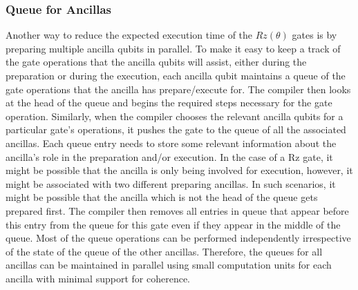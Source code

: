 \subsubsection{Queue for Ancillas}
Another way to reduce the expected execution time of the $Rz(\theta)$ gates is by preparing multiple ancilla qubits in parallel. To make it easy to keep a track of the gate operations that the ancilla qubits will assist, either during the preparation or during the execution, each ancilla qubit maintains a queue of the gate operations that the ancilla has prepare/execute for. The compiler then looks at the head of the queue and begins the required steps necessary for the gate operation. Similarly, when the compiler chooses the relevant ancilla qubits for a particular gate's operations, it pushes the gate to the queue of all the associated ancillas. Each queue entry needs to store some relevant information about the ancilla's role in the preparation and/or execution. In the case of a Rz gate, it might be possible that the ancilla is only being involved for execution, however, it might be associated with two different preparing ancillas. In such scenarios, it might be possible that the ancilla which is not the head of the queue gets prepared first. The compiler then removes all entries in queue that appear before this entry from the queue for this gate even if they appear in the middle of the queue. Most of the queue operations can be performed independently irrespective of the state of the queue of the other ancillas. Therefore, the queues for all ancillas can be maintained in parallel using small computation units for each ancilla with minimal support for coherence.

%     

